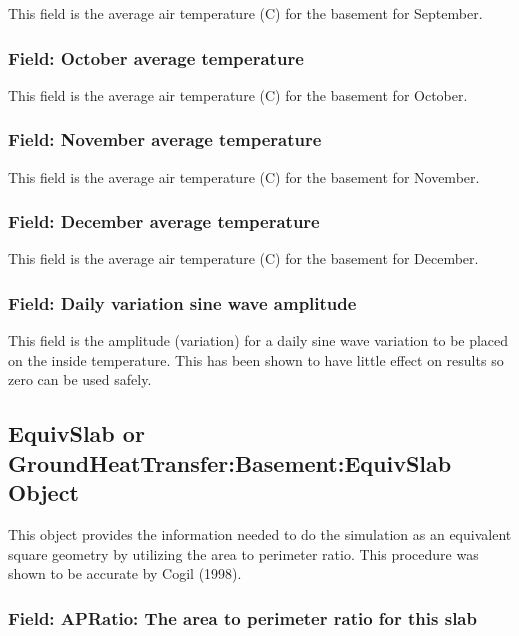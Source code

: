 This field is the average air temperature (C) for the basement for September.

\subsubsection{Field: October average temperature}\label{field-october-average-temperature}

This field is the average air temperature (C) for the basement for October.

\subsubsection{Field: November average temperature}\label{field-november-average-temperature}

This field is the average air temperature (C) for the basement for November.

\subsubsection{Field: December average temperature}\label{field-december-average-temperature}

This field is the average air temperature (C) for the basement for December.

\subsubsection{Field: Daily variation sine wave amplitude}\label{field-daily-variation-sine-wave-amplitude}

This field is the amplitude (variation) for a daily sine wave variation to be placed on the inside temperature. This has been shown to have little effect on results so zero can be used safely.

\subsection{EquivSlab or GroundHeatTransfer:Basement:EquivSlab Object}\label{equivslab-or-groundheattransferbasementequivslab-object}

This object provides the information needed to do the simulation as an equivalent square geometry by utilizing the area to perimeter ratio. This procedure was shown to be accurate by Cogil (1998).

\subsubsection{Field: APRatio: The area to perimeter ratio for this slab}\label{field-apratio-the-area-to-perimeter-ratio-for-this-slab}

